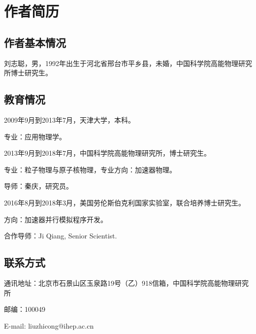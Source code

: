 \chapter{作者简历}

\section*{作者基本情况}

刘志聪，男，1992年出生于河北省邢台市平乡县，未婚，中国科学院高能物理研究所博士研究生。

\section*{教育情况}
\noindent
2009年9月到2013年7月，天津大学，本科。

专业：应用物理学。

\noindent
2013年9月到2018年7月，中国科学院高能物理研究所，博士研究生。

专业：粒子物理与原子核物理，专业方向：加速器物理。

导师：秦庆，研究员。

\noindent
2016年8月到2018年3月，美国劳伦斯伯克利国家实验室，联合培养博士研究生。

方向：加速器并行模拟程序开发。

合作导师：Ji Qiang, Senior Scientist.

\section*{联系方式}

通讯地址：北京市石景山区玉泉路19号（乙）918信箱，中国科学院高能物理研究所

邮编：100049

E-mail: liuzhicong@ihep.ac.cn

